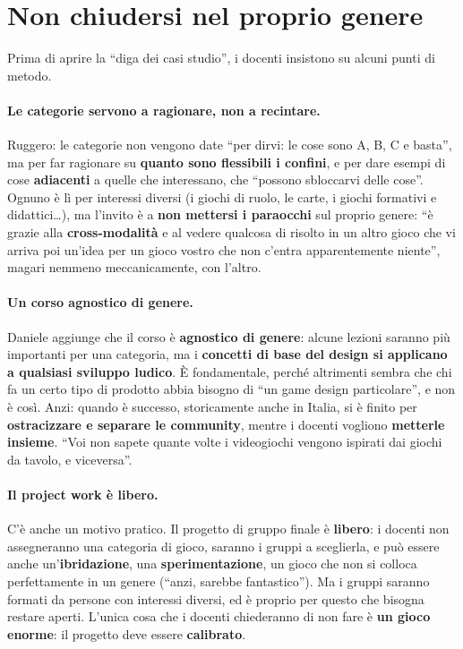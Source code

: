 \section{Non chiudersi nel proprio genere}
\label{a2:sec:aperti}

Prima di aprire la ``diga dei casi studio'', i docenti insistono su alcuni punti
di metodo.

\paragraph{Le categorie servono a ragionare, non a recintare.} Ruggero: le
categorie non vengono date ``per dirvi: le cose sono A, B, C e basta'', ma per
far ragionare su \textbf{quanto sono flessibili i confini}, e per dare esempi di
cose \textbf{adiacenti} a quelle che interessano, che ``possono sbloccarvi delle
cose''. Ognuno è lì per interessi diversi (i giochi di ruolo, le carte, i giochi
formativi e didattici\ldots), ma l'invito è a \textbf{non mettersi i paraocchi}
sul proprio genere: ``è grazie alla \textbf{cross-modalità} e al vedere qualcosa
di risolto in un altro gioco che vi arriva poi un'idea per un gioco vostro che
non c'entra apparentemente niente'', magari nemmeno meccanicamente, con l'altro.

\paragraph{Un corso agnostico di genere.} Daniele aggiunge che il corso è
\textbf{agnostico di genere}: alcune lezioni saranno più importanti per una
categoria, ma i \textbf{concetti di base del design si applicano a qualsiasi
sviluppo ludico}. È fondamentale, perché altrimenti sembra che chi fa un certo
tipo di prodotto abbia bisogno di ``un game design particolare'', e non è così.
Anzi: quando è successo, storicamente anche in Italia, si è finito per
\textbf{ostracizzare e separare le community}, mentre i docenti vogliono
\textbf{metterle insieme}. ``Voi non sapete quante volte i videogiochi vengono
ispirati dai giochi da tavolo, e viceversa''.

\paragraph{Il project work è libero.} C'è anche un motivo pratico. Il progetto
di gruppo finale è \textbf{libero}: i docenti non assegneranno una categoria di
gioco, saranno i gruppi a sceglierla, e può essere anche
un'\textbf{ibridazione}, una \textbf{sperimentazione}, un gioco che non si
colloca perfettamente in un genere (``anzi, sarebbe fantastico''). Ma i gruppi
saranno formati da persone con interessi diversi, ed è proprio per questo che
bisogna restare aperti. L'unica cosa che i docenti chiederanno di non fare è
\textbf{un gioco enorme}: il progetto deve essere \textbf{calibrato}.

